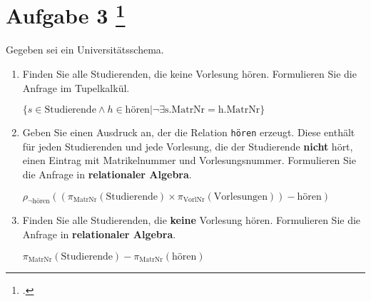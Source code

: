 \documentclass{lehramt-informatik-aufgabe}
\begin{document}
\section{Aufgabe 3
\footcite{66116:2020:03}}

Gegeben sei ein Universitätsschema.

\begin{enumerate}


\item Finden Sie alle Studierenden, die keine Vorlesung hören.
Formulieren Sie die Anfrage im Tupelkalkül.

\begin{liAntwort}
$\{ s \in \text{Studierende} \land h \in \text{hören} | \neg \exists \text{s.MatrNr} = \text{h.MatrNr} \}$
\end{liAntwort}


\item Geben Sie einen Ausdruck an, der die Relation \neg \texttt{hören}
erzeugt. Diese enthält für jeden Studierenden und jede Vorlesung, die
der Studierende \textbf{nicht} hört, einen Eintrag mit Matrikelnummer
und Vorlesungsnummer. Formulieren Sie die Anfrage in
\textbf{relationaler Algebra}.

\begin{liAntwort}
$\rho_{\neg \text{hören}} \left(
(
  \pi_{\text{MatrNr}}(\text{Studierende})
  \times
  \pi_{\text{VorlNr}}(\text{Vorlesungen})
) - \text{hören}
\right)
$
\end{liAntwort}


\item Finden Sie alle Studierenden, die \textbf{keine} Vorlesung hören.
Formulieren Sie die Anfrage in \textbf{relationaler Algebra}.

\begin{liAntwort}
$\pi_{\text{MatrNr}}(\text{Studierende}) - \pi_{\text{MatrNr}}(\text{hören})$
\end{liAntwort}
\end{enumerate}
\end{document}
